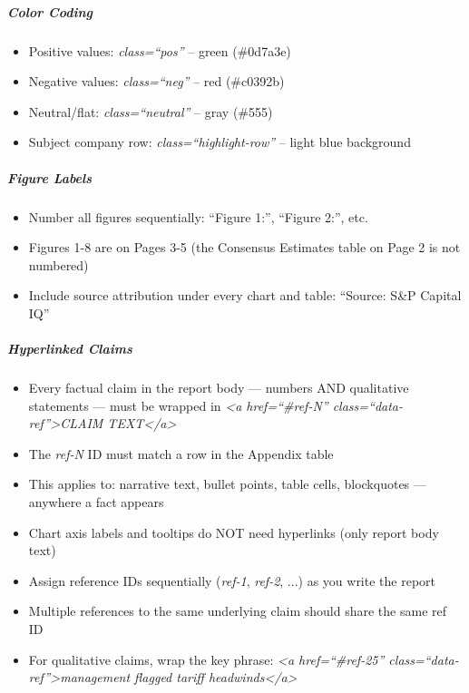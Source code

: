 \documentclass[11pt]{article}
\begin{document}
\subparagraph{Color Coding}\mbox{}\par
\begin{itemize}[leftmargin=*,itemsep=2pt,topsep=2pt]
\item {} Positive values: \emph{class=``pos''} -- green (\#0d7a3e)
\item {} Negative values: \emph{class=``neg''} -- red (\#c0392b)
\item {} Neutral/flat: \emph{class=``neutral''} -- gray (\#555)
\item {} Subject company row: \emph{class=``highlight-row''} -- light blue background
\end{itemize}

\subparagraph{Figure Labels}\mbox{}\par
\begin{itemize}[leftmargin=*,itemsep=2pt,topsep=2pt]
\item {} Number all figures sequentially: ``Figure 1:'', ``Figure 2:'', etc.
\item {} Figures 1-8 are on Pages 3-5 (the Consensus Estimates table on Page 2 is not numbered)
\item {} Include source attribution under every chart and table: ``Source: S\&P Capital IQ''
\end{itemize}

\subparagraph{Hyperlinked Claims}\mbox{}\par
\begin{itemize}[leftmargin=*,itemsep=2pt,topsep=2pt]
\item {} Every factual claim in the report body — numbers AND qualitative statements — must be wrapped in \emph{<a href=``\#ref-N'' class=``data-ref''>CLAIM TEXT</a>}
\item {} The \emph{ref-N} ID must match a row in the Appendix table
\item {} This applies to: narrative text, bullet points, table cells, blockquotes — anywhere a fact appears
\item {} Chart axis labels and tooltips do NOT need hyperlinks (only report body text)
\item {} Assign reference IDs sequentially (\emph{ref-1}, \emph{ref-2}, ...) as you write the report
\item {} Multiple references to the same underlying claim should share the same ref ID
\item {} For qualitative claims, wrap the key phrase: \emph{<a href=``\#ref-25'' class=``data-ref''>management flagged tariff headwinds</a>}
\end{itemize}
\end{document}
